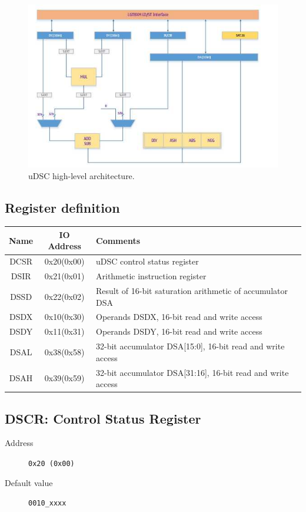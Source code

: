 \begin{figure}[tb]
\includegraphics[width=\columnwidth]{Images/f-028}
\caption{uDSC high-level architecture.}
\end{figure}


\subsection{Register definition}
\begin{tabular}{ccl}
\toprule
Name & IO Address & Comments\\
\midrule
DCSR & 0x20(0x00) & uDSC control status register \\
DSIR & 0x21(0x01) & Arithmetic instruction register \\
DSSD & 0x22(0x02) & Result of 16-bit saturation arithmetic of accumulator DSA \\
DSDX & 0x10(0x30) & Operands DSDX, 16-bit read and write access \\
DSDY & 0x11(0x31) & Operands DSDY, 16-bit read and write access \\
DSAL & 0x38(0x58) & 32-bit accumulator DSA[15:0], 16-bit read and write access \\
DSAH & 0x39(0x59) & 32-bit accumulator DSA[31:16], 16-bit read and write access \\
\bottomrule
\end{tabular}

\subsection{DSCR: Control Status Register}

\begin{description}
\item[Address] \texttt{0x20 (0x00)}
\item[Default value] \texttt{0010\_xxxx}
\end{description}

